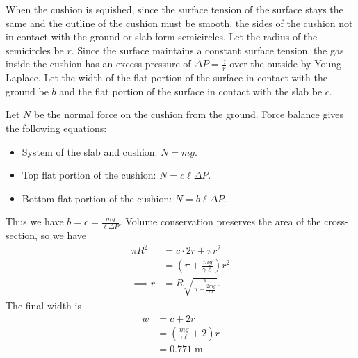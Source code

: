 \begin{solution}

When the cushion is squished, since the surface tension of the surface stays the same and the outline of the cushion must be smooth, the sides of the cushion not in contact with the ground or slab form semicircles. Let the radius of the semicircles be $r$. Since the surface maintains a constant surface tension, the gas inside the cushion has an excess pressure of $\Delta P=\frac{\gamma}{r}$ over the outside by Young-Laplace. Let the width of the flat portion of the surface in contact with the ground be $b$ and the flat portion of the surface in contact with the slab be $c$.

Let $N$ be the normal force on the cushion from the ground. Force balance gives the following equations:
\begin{itemize}
    \item System of the slab and cushion: $N=mg$.
    \item Top flat portion of the cushion: $N=c\ell\Delta P$.
    \item Bottom flat portion of the cushion: $N=b\ell\Delta P$.
\end{itemize}
Thus we have $b=c=\frac{mg}{\ell\Delta P}$.
Volume conservation preserves the area of the cross-section, so we have
\begin{align*}
    \pi R^2 &= c\cdot 2r+\pi r^2 \\
            &= (\pi+\frac{mg}{\gamma\ell})r^2 \\
    \implies r&=R\sqrt{\frac{\pi}{\pi+\frac{2mg}{\gamma\ell}}}.
\end{align*}
The final width is
\begin{align*}
    w &= c+2r \\
      &= (\frac{mg}{\gamma\ell}+2)r \\
      &= \boxed{0.771\;\mathrm{m}}.
\end{align*}

\end{solution}